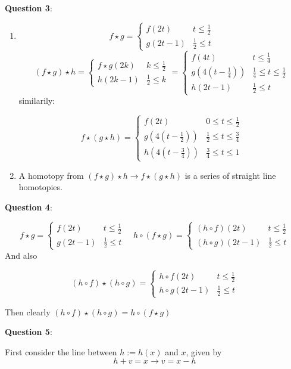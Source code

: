 \documentclass{article} %
\newcommand{\question}[2][]{
  \begin{flushleft}
    \textbf{Question #1}: \textit{#2}

\end{flushleft}}
\begin{document}
\question[3]{}
\begin{enumerate}
  \item \[
      f \star g =
      \begin{cases}
        f(2t) & t \le \frac{1}{2} \\
        g(2t - 1) & \frac{1}{2} \le t
      \end{cases}
    \]
    \[
      (f \star g) \star h =
      \begin{cases}
        f\star g (2k) & k \le \frac{1}{2} \\
        h(2k-1) & \frac{1}{2} \le k
      \end{cases} =
      \begin{cases}
        f(4t)  & t \le \frac{1}{4} \\
        g(4(t-\frac{1}{4}))  &  \frac{1}{4} \le t \le \frac{1}{2} \\
        h(2t-1) & \frac{1}{2} \le t
      \end{cases}
    \]
    similarily:

    \[
      f\star (g \star h) =
      \begin{cases}
        f(2t) & 0 \le t \le \frac{1}{2} \\
        g(4(t - \frac{1}{2})) & \frac{1}{2} \le t \le \frac{3}{4} \\
        h(4(t- \frac{3}{4})) & \frac{3}{4} \le t \le 1
      \end{cases}
    \]
  \item A homotopy from $(f \star g) \star h \to f \star (g \star h)$
    is a series of straight line homotopies.
\end{enumerate}
\question[4]{}
\[
  f \star g =
  \begin{cases}
    f(2t) & t \le \frac{1}{2} \\
    g(2t - 1) & \frac{1}{2} \le t
  \end{cases} \quad
  h \circ (f \star g) =
  \begin{cases}
    (h \circ f)(2t) & t \le \frac{1}{2} \\
    (h \circ g)(2t - 1) & \frac{1}{2} \le t
  \end{cases}
\]
And also

\[
  (h \circ f) \star (h \circ g) =
  \begin{cases}
    h\circ f (2t) & t \le \frac{1}{2} \\
    h \circ g (2t - 1) & \frac{1}{2} \le t
  \end{cases}
\]

Then clearly $(h \circ f) \star (h \circ g) =  h \circ (f \star g)$
\question[5]{}
First consider the line between $h:= h(x)$ and $x$, given by
\[
  h + v = x \to v = x - h
\]
\end{document}

